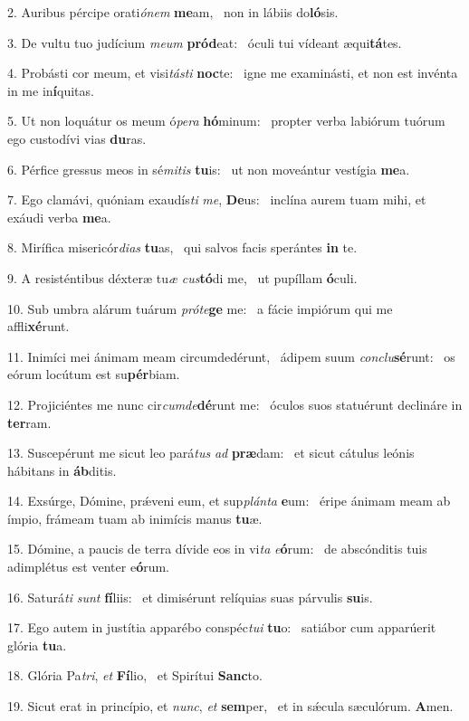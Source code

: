 2. Auribus pércipe orati\textit{ó}\textit{nem} \textbf{me}am, \ast\  non in lábiis do\textbf{ló}sis.\

3. De vultu tuo judícium \textit{me}\textit{um} \textbf{pród}eat: \ast\  óculi tui vídeant æqui\textbf{tá}tes.\

4. Probásti cor meum, et visi\textit{tás}\textit{ti} \textbf{noc}te: \ast\  igne me examinásti, et non est invénta in me in\textbf{í}quitas.\

5. Ut non loquátur os meum ó\textit{pe}\textit{ra} \textbf{hó}minum: \ast\  propter verba labiórum tuórum ego custodívi vias \textbf{du}ras.\

6. Pérfice gressus meos in sé\textit{mi}\textit{tis} \textbf{tu}is: \ast\  ut non moveántur vestígia \textbf{me}a.\

7. Ego clamávi, quóniam exaudís\textit{ti} \textit{me}, \textbf{De}us: \ast\  inclína aurem tuam mihi, et exáudi verba \textbf{me}a.\

8. Mirífica misericór\textit{di}\textit{as} \textbf{tu}as, \ast\  qui salvos facis sperántes \textbf{in} te.\

9. A resisténtibus déxteræ tu\textit{æ} \textit{cus}\textbf{tó}di me, \ast\  ut pupíllam \textbf{ó}culi.\

10. Sub umbra alárum tuárum \textit{pró}\textit{te}\textbf{ge} me: \ast\  a fácie impiórum qui me affli\textbf{xé}runt.\

11. Inimíci mei ánimam meam circumdedérunt, \dag\  ádipem suum \textit{con}\textit{clu}\textbf{sé}runt: \ast\  os eórum locútum est su\textbf{pér}biam.\

12. Projiciéntes me nunc cir\textit{cum}\textit{de}\textbf{dé}runt me: \ast\  óculos suos statuérunt declináre in \textbf{ter}ram.\

13. Suscepérunt me sicut leo pará\textit{tus} \textit{ad} \textbf{præ}dam: \ast\  et sicut cátulus leónis hábitans in \textbf{áb}ditis.\

14. Exsúrge, Dómine, prǽveni eum, et sup\textit{plán}\textit{ta} \textbf{e}um: \ast\  éripe ánimam meam ab ímpio, frámeam tuam ab inimícis manus \textbf{tu}æ.\

15. Dómine, a paucis de terra dívide eos in vi\textit{ta} \textit{e}\textbf{ó}rum: \ast\  de abscónditis tuis adimplétus est venter e\textbf{ó}rum.\

16. Saturá\textit{ti} \textit{sunt} \textbf{fí}liis: \ast\  et dimisérunt relíquias suas párvulis \textbf{su}is.\

17. Ego autem in justítia apparébo conspéc\textit{tu}\textit{i} \textbf{tu}o: \ast\  satiábor cum apparúerit glória \textbf{tu}a.\

18. Glória Pa\textit{tri}, \textit{et} \textbf{Fí}lio, \ast\  et Spirítui \textbf{Sanc}to.\

19. Sicut erat in princípio, et \textit{nunc}, \textit{et} \textbf{sem}per, \ast\  et in sǽcula sæculórum. \textbf{A}men.\

